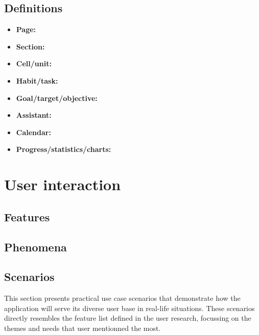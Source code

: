 \documentclass{article}
\begin{document}
\subsection{Definitions}


\begin{itemize}
    \item \textbf{Page:}
    \item \textbf{Section:}
    \item \textbf{Cell/unit:}
    \item \textbf{Habit/task:}
    \item \textbf{Goal/target/objective:}
    \item \textbf{Assistant:}
    \item \textbf{Calendar:}
    \item \textbf{Progress/statistics/charts:}
\end{itemize}

\section{User interaction}

\subsection{Features}


\subsection{Phenomena}


\subsection{Scenarios}

This section presents practical use case scenarios that demonstrate how the application will serve its diverse user base in real-life situations.
These scenarios directly resembles the feature list defined in the user research, focussing on the themes and needs that user mentionned the most.
\end{document}
